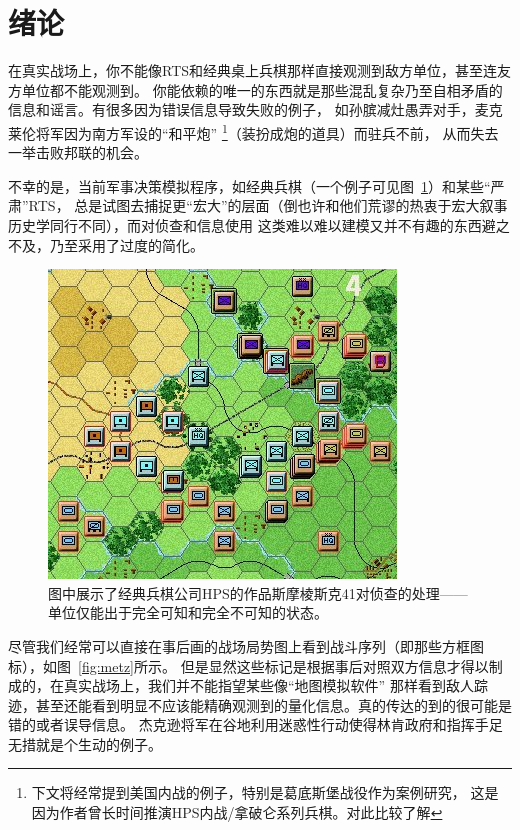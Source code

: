\documentclass{sicnuthesis}
\begin{document}
\clearpage

\tableofcontents

\clearpage

\mainmatter %

\section{绪论}

在真实战场上，你不能像RTS和经典桌上兵棋那样直接观测到敌方单位，甚至连友方单位都不能观测到。
你能依赖的唯一的东西就是那些混乱复杂乃至自相矛盾的信息和谣言。有很多因为错误信息导致失败的例子，
如孙膑减灶愚弄对手，麦克莱伦将军因为南方军设的“和平炮”
\footnote{下文将经常提到美国内战的例子，特别是葛底斯堡战役作为案例研究，
这是因为作者曾长时间推演HPS内战/拿破仑系列兵棋。对此比较了解}（装扮成炮的道具）而驻兵不前，
从而失去一举击败邦联的机会。

不幸的是，当前军事决策模拟程序，如经典兵棋（一个例子可见图~\ref{fig:hps}）和某些“严肃”RTS，
总是试图去捕捉更“宏大”的层面（倒也许和他们荒谬的热衷于宏大叙事历史学同行不同），而对侦查和信息使用
这类难以难以建模又并不有趣的东西避之不及，乃至采用了过度的简化。

\begin{figure}[htb]
\includegraphics[width=0.6\linewidth]{SmolenskR4.jpg}
\caption{
图中展示了经典兵棋公司HPS的作品斯摩棱斯克41对侦查的处理——单位仅能出于完全可知和完全不可知的状态。 }
\label{fig:hps}
\end{figure}


尽管我们经常可以直接在事后画的战场局势图上看到战斗序列（即那些方框图标），如图~\ref{fig:metz}所示。
但是显然这些标记是根据事后对照双方信息才得以制成的，在真实战场上，我们并不能指望某些像“地图模拟软件”
那样看到敌人踪迹，甚至还能看到明显不应该能精确观测到的量化信息。真的传达的到的很可能是错的或者误导信息。
杰克逊将军在谷地利用迷惑性行动使得林肯政府和指挥手足无措就是个生动的例子。
\end{document}
